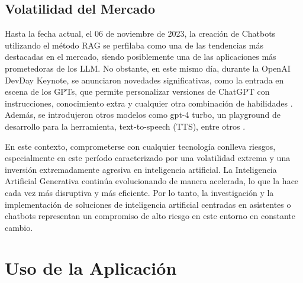 













\subsection{Volatilidad del Mercado}

Hasta la fecha actual, el 06 de noviembre de 2023, la creación de Chatbots utilizando el método RAG se perfilaba como 
una de las tendencias más destacadas en el mercado, siendo posiblemente una de las aplicaciones más prometedoras de los LLM. 
No obstante, en este mismo día, durante la OpenAI DevDay Keynote, se anunciaron novedades significativas, como la entrada en 
escena de los GPTs, que permite personalizar versiones de ChatGPT con instrucciones, conocimiento extra y cualquier otra combinación 
de habilidades \cite{openai2}. Además, se introdujeron otros modelos como gpt-4 turbo, un playground de desarrollo para la herramienta, 
text-to-speech (TTS), entre otros \cite{openai3}.

En este contexto, comprometerse con cualquier tecnología conlleva riesgos, especialmente en este período caracterizado por una 
volatilidad extrema y una inversión extremadamente agresiva en inteligencia artificial. La Inteligencia Artificial Generativa 
continúa evolucionando de manera acelerada, lo que la hace cada vez más disruptiva y más eficiente. Por lo tanto, la investigación 
y la implementación de soluciones de inteligencia artificial centradas en asistentes o chatbots representan un compromiso de alto 
riesgo en este entorno en constante cambio.

\section{Uso de la Aplicación}

